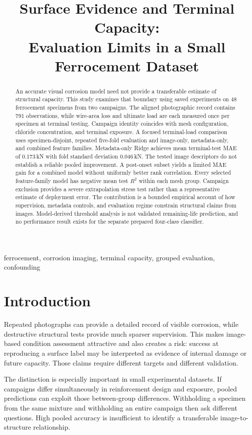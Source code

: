 \documentclass[conference]{IEEEtran}
\title{Surface Evidence and Terminal Capacity:\\Evaluation Limits in a Small Ferrocement Dataset}
\author{\IEEEauthorblockN{Parastoo Hashemi Alvar}\IEEEauthorblockA{Politecnico di Torino\\Turin, Italy}}
\begin{document}
\maketitle
\begin{abstract}
An accurate visual corrosion model need not provide a transferable estimate of structural capacity. This study examines that boundary using saved experiments on 48 ferrocement specimens from two campaigns. The aligned photographic record contains 791 observations, while wire-area loss and ultimate load are each measured once per specimen at terminal testing. Campaign identity coincides with mesh configuration, chloride concentration, and terminal exposure. A focused terminal-load comparison uses specimen-disjoint, repeated five-fold evaluation and image-only, metadata-only, and combined feature families. Metadata-only Ridge achieves mean terminal-test MAE of 0.173\,kN with fold standard deviation 0.046\,kN. The tested image descriptors do not establish a reliable pooled improvement. A post-onset subset yields a limited MAE gain for a combined model without uniformly better rank correlation. Every selected feature-family model has negative mean test $R^2$ within each mesh group. Campaign exclusion provides a severe extrapolation stress test rather than a representative estimate of deployment error. The contribution is a bounded empirical account of how supervision, metadata controls, and evaluation regime constrain structural claims from images. Model-derived threshold analysis is not validated remaining-life prediction, and no performance result exists for the separate prepared four-class classifier.
\end{abstract}
\begin{IEEEkeywords}
ferrocement, corrosion imaging, terminal capacity, grouped evaluation, confounding
\end{IEEEkeywords}

\section{Introduction}
Repeated photographs can provide a detailed record of visible corrosion, while destructive structural tests provide much sparser supervision. This makes image-based condition assessment attractive and also creates a risk: success at reproducing a surface label may be interpreted as evidence of internal damage or future capacity. Those claims require different targets and different validation.

The distinction is especially important in small experimental datasets. If campaigns differ simultaneously in reinforcement design and exposure, pooled predictions can exploit those between-group differences. Withholding a specimen from the same mixture and withholding an entire campaign then ask different questions. High pooled accuracy is insufficient to identify a transferable image-to-structure relationship.
\end{document}
